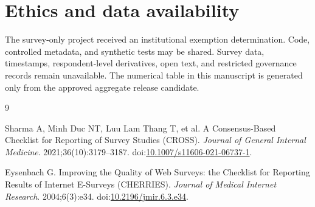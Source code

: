 \documentclass[11pt]{article}
\begin{document}
\section*{Ethics and data availability}

The survey-only project received an institutional exemption determination. Code,
controlled metadata, and synthetic tests may be shared. Survey data, timestamps,
respondent-level derivatives, open text, and restricted governance records
remain unavailable. The numerical table in this manuscript is generated only
from the approved aggregate release candidate.

\begin{thebibliography}{9}

Sharma A, Minh Duc NT, Luu Lam Thang T, et al.
A Consensus-Based Checklist for Reporting of Survey Studies (CROSS).
\textit{Journal of General Internal Medicine}. 2021;36(10):3179--3187.
doi:\href{https://doi.org/10.1007/s11606-021-06737-1}{10.1007/s11606-021-06737-1}.

Eysenbach G.
Improving the Quality of Web Surveys: the Checklist for Reporting Results of
Internet E-Surveys (CHERRIES).
\textit{Journal of Medical Internet Research}. 2004;6(3):e34.
doi:\href{https://doi.org/10.2196/jmir.6.3.e34}{10.2196/jmir.6.3.e34}.

\end{thebibliography}
\end{document}
